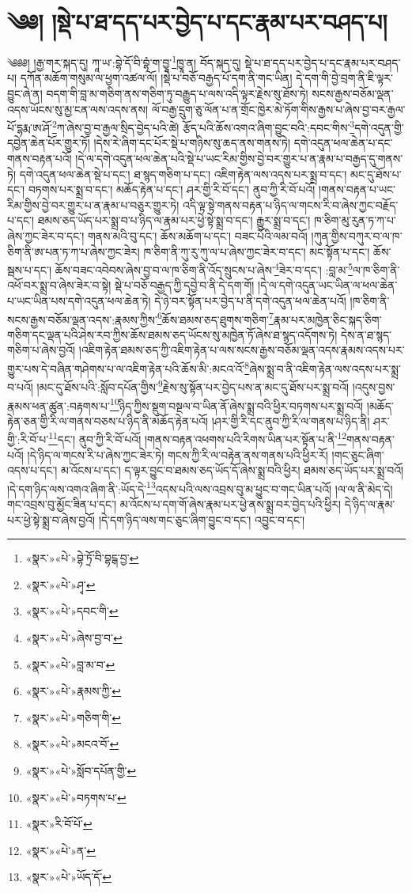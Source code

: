\chapter{༄༅། །སྡེ་པ་ཐ་དད་པར་བྱེད་པ་དང་རྣམ་པར་བཤད་པ།}༄༅༅། །རྒྱ་གར་སྐད་དུ། ཀཱ་ཡ་:བྷེ་དོ་བི་བྷཾ་ག་བྱཱ་\footnote{«སྣར་»«པེ་»བྷེ་ཏྲོ་བི་བྷངྒ་བྱ་}ཁྱཱ་ན། བོད་སྐད་དུ། སྡེ་པ་ཐ་དད་པར་བྱེད་པ་དང་རྣམ་པར་བཤད་པ། དཀོན་མཆོག་གསུམ་ལ་ཕྱག་འཚལ་ལོ། །སྡེ་པ་བཅོ་བརྒྱད་པོ་དག་ནི་གང་ཡིན། དེ་དག་གི་བྱེ་བྲག་ནི་ཇི་ལྟར་བྱུང་ཞེ་ན། བདག་གི་བླ་མ་གཅིག་ནས་གཅིག་ཏུ་བརྒྱུད་པ་ལས་འདི་ལྟར་རྗེས་སུ་ཐོས་ཏེ། སངས་རྒྱས་བཅོམ་ལྡན་འདས་ཡོངས་སུ་མྱ་ངན་ལས་འདས་ནས། ལོ་བརྒྱ་དྲུག་ཅུ་ལོན་པ་ན་གྲོང་ཁྱེར་མེ་ཏོག་གིས་རྒྱས་པ་ཞེས་བྱ་བར་རྒྱལ་པོ་དྷརྨ་ཨ་ཤོ་\footnote{«སྣར་»«པེ་»ཤྭ་}ཀ་ཞེས་བྱ་བ་རྒྱལ་སྲིད་བྱེད་པའི་ཚེ། རྩོད་པའི་ཆོས་འགའ་ཞིག་བྱུང་བའི་:དབང་གིས་\footnote{«སྣར་»«པེ་»དབང་གི་}དགེ་འདུན་གྱི་དབྱེན་ཆེན་པོར་གྱུར་ཏོ། །དེས་རེ་ཞིག་དང་པོར་སྡེ་པ་གཉིས་སུ་ཆད་ནས་གནས་ཏེ། དགེ་འདུན་ཕལ་ཆེན་པ་དང་གནས་བརྟན་པའོ། །དེ་ལ་དགེ་འདུན་ཕལ་ཆེན་པའི་སྡེ་པ་ཡང་རིམ་གྱིས་བྱེ་བར་གྱུར་པ་ན་རྣམ་པ་བརྒྱད་དུ་གནས་ཏེ། དགེ་འདུན་ཕལ་ཆེན་སྡེ་པ་དང་། ཐ་སྙད་གཅིག་པ་དང་། འཇིག་རྟེན་ལས་འདས་པར་སྨྲ་བ་དང་། མང་དུ་ཐོས་པ་དང་། བཏགས་པར་སྨྲ་བ་དང་། མཆོད་རྟེན་པ་དང་། ཤར་གྱི་རི་བོ་དང་། ནུབ་ཀྱི་རི་བོ་པའོ། །གནས་བརྟན་པ་ཡང་རིམ་གྱིས་བྱེ་བར་གྱུར་པ་ན་རྣམ་པ་བཅུར་གྱུར་ཏེ། འདི་ལྟ་སྟེ་གནས་བརྟན་པ་ཉིད་ལ་གངས་རི་བ་ཞེས་ཀྱང་བརྗོད་པ་དང་། ཐམས་ཅད་ཡོད་པར་སྨྲ་བ་པ་ཉིད་ལ་རྣམ་པར་ཕྱེ་སྟེ་སྨྲ་བ་དང་། རྒྱུར་སྨྲ་བ་དང་། ཁ་ཅིག་མུ་རུན་ཏ་ཀ་པ་ཞེས་ཀྱང་ཟེར་བ་དང་། གནས་མའི་བུ་དང་། ཆོས་མཆོག་པ་དང་། བཟང་པོའི་ལམ་བའོ། །ཀུན་གྱིས་བཀུར་བ་ལ་ཁ་ཅིག་ནི་ཨ་པན་ཏ་ཀ་པ་ཞེས་ཀྱང་ཟེར། ཁ་ཅིག་ནི་ཀུ་རུ་ཀུ་ལ་པ་ཞེས་ཀྱང་ཟེར་བ་དང་། མང་སྟོན་པ་དང་། ཆོས་སྦས་པ་དང་། ཆོས་བཟང་འབེབས་ཞེས་བྱ་བ་ལ་ཁ་ཅིག་ནི་འོད་སྲུངས་པ་ཞེས་\footnote{«སྣར་»«པེ་»ཞེས་བྱ་བ་}ཟེར་བ་དང་། :བླ་མ་\footnote{«སྣར་»«པེ་»བླ་མ་བ་}ལ་ཁ་ཅིག་ནི་འཕོ་བར་སྨྲ་བ་ཞེས་ཟེར་བ་སྟེ། སྡེ་པ་བཅོ་བརྒྱད་ཀྱི་དབྱེ་བ་ནི་དེ་དག་གོ། །དེ་ལ་དགེ་འདུན་ཡང་ཡིན་ལ་ཕལ་ཆེན་པ་ཡང་ཡིན་པས་དགེ་འདུན་ཕལ་ཆེན་ཏེ། དེ་ཉེ་བར་སྟོན་པར་བྱེད་པ་ནི་དགེ་འདུན་ཕལ་ཆེན་པའོ། །ཁ་ཅིག་ནི་སངས་རྒྱས་བཅོམ་ལྡན་འདས་:རྣམས་ཀྱིས་\footnote{«སྣར་»«པེ་»རྣམས་ཀྱི་}ཆོས་ཐམས་ཅད་ཐུགས་གཅིག་\footnote{«སྣར་»«པེ་»གཅིག་གི་}རྣམ་པར་མཁྱེན་ཅིང་སྐད་ཅིག་གཅིག་དང་ལྡན་པའི་ཤེས་རབ་ཀྱིས་ཆོས་ཐམས་ཅད་ཡོངས་སུ་མཁྱེན་ཏོ་ཞེས་ཐ་སྙད་འདོགས་ཏེ། དེས་ན་ཐ་སྙད་གཅིག་པ་ཞེས་བྱའོ། །འཇིག་རྟེན་ཐམས་ཅད་ཀྱི་འཇིག་རྟེན་པ་ལས་སངས་རྒྱས་བཅོམ་ལྡན་འདས་རྣམས་འདས་པར་གྱུར་པས་དེ་བཞིན་གཤེགས་པ་ལ་འཇིག་རྟེན་པའི་ཆོས་མི་:མངའ་འོ་\footnote{«སྣར་»«པེ་»མངའ་བོ་}ཞེས་སྨྲ་བ་ནི་འཇིག་རྟེན་ལས་འདས་པར་སྨྲ་བ་པའོ། །མང་དུ་ཐོས་པའི་:སློབ་དཔོན་གྱིས་\footnote{«སྣར་»«པེ་»སློབ་དཔོན་གྱི་}རྗེས་སུ་སྟོན་པར་བྱེད་པས་ན་མང་དུ་ཐོས་པར་སྨྲ་བའོ། །འདུས་བྱས་རྣམས་ཕན་ཚུན་:བརྟགས་པ་\footnote{«སྣར་»«པེ་»བཏགས་པ་}ཉིད་ཀྱིས་སྡུག་བསྔལ་བ་ཡིན་ནོ་ཞེས་སྨྲ་བའི་ཕྱིར་བཏགས་པར་སྨྲ་བའོ། །མཆོད་རྟེན་ཅན་གྱི་རི་ལ་གནས་བཅས་པ་ཉིད་ནི་མཆོད་རྟེན་པའོ། །ཤར་གྱི་རི་དང་ནུབ་ཀྱི་རི་ལ་གནས་པ་ཉིད་ནི། ཤར་གྱི་:རི་བོ་པ་\footnote{«སྣར་»རི་བོ་པོ་}དང་། ནུབ་ཀྱི་རི་བོ་པའོ། །གནས་བརྟན་འཕགས་པའི་རིགས་ཡིན་པར་སྟོན་པ་ནི་\footnote{«སྣར་»«པེ་»ན་}གནས་བརྟན་པའོ། །དེ་ཉིད་ལ་གངས་རི་པ་ཞེས་ཀྱང་ཟེར་ཏེ། གངས་ཀྱི་རི་ལ་བརྟེན་ནས་གནས་པའི་ཕྱིར་རོ། །གང་ཅུང་ཞིག་འདས་པ་དང་། མ་འོངས་པ་དང་། ད་ལྟར་བྱུང་བ་ཐམས་ཅད་ཡོད་དོ་ཞེས་སྨྲ་བའི་ཕྱིར། ཐམས་ཅད་ཡོད་པར་སྨྲ་བའོ། །དེ་དག་ཉིད་ལས་འགའ་ཞིག་ནི་:ཡོད་དེ་\footnote{«སྣར་»«པེ་»ཡོད་དོ་}འདས་པའི་ལས་འབྲས་བུ་མ་ཕྱུང་བ་གང་ཡིན་པའོ། །ལ་ལ་ནི་མེད་དེ། གང་འབྲས་བུ་མྱོང་ཟིན་པ་དང་། མ་འོངས་པ་དག་གོ་ཞེས་རྣམ་པར་ཕྱེ་ནས་སྨྲ་བར་བྱེད་པའི་ཕྱིར། དེ་ཉིད་ལ་རྣམ་པར་ཕྱེ་སྟེ་སྨྲ་བ་ཞེས་བྱའོ། །དེ་དག་ཉིད་ལས་གང་ཅུང་ཞིག་བྱུང་བ་དང་། འབྱུང་བ་དང་། 